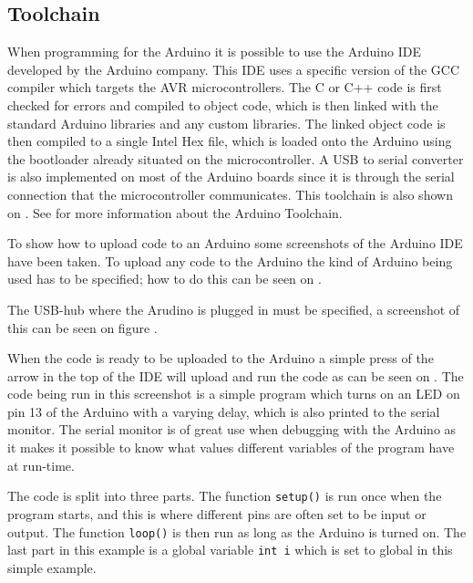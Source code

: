 \subsection{Toolchain}
When programming for the Arduino it is possible to use the Arduino IDE developed by the Arduino company.
This IDE uses a specific version of the GCC compiler which targets the AVR microcontrollers.
The C or C++ code is first checked for errors and compiled to object code, which is then linked with the standard Arduino libraries and any custom libraries.
The linked object code is then compiled to a single Intel Hex file, which is loaded onto the Arduino using the bootloader already situated on the microcontroller.
A USB to serial converter is also implemented on most of the Arduino boards since it is through the serial connection that the microcontroller communicates. 
This toolchain is also shown on . 
See \cite{2015ArduinoToolchain} for more information about the Arduino Toolchain.


\noindent
To show how to upload code to an Arduino some screenshots of the Arduino IDE have been taken.
To upload any code to the Arduino the kind of Arduino being used has to be specified; how to do this can be seen on .

The USB-hub where the Arudino is plugged in must be specified, a screenshot of this can be seen on figure .

When the code is ready to be uploaded to the Arduino a simple press of the arrow in the top of the IDE will upload and run the code as can be seen on . 
The code being run in this screenshot is a simple program which turns on an LED on pin 13 of the Arduino with a varying delay, which is also printed to the serial monitor.
The serial monitor is of great use when debugging with the Arduino as it makes it possible to know what values different variables of the program have at run-time.

The code is split into three parts.
The function \texttt{setup()} is run once when the program starts, and this is where different pins are often set to be input or output.
The function \texttt{loop()} is then run as long as the Arduino is turned on. 
The last part in this example is a global variable \texttt{int i} which is set to global in this simple example.

